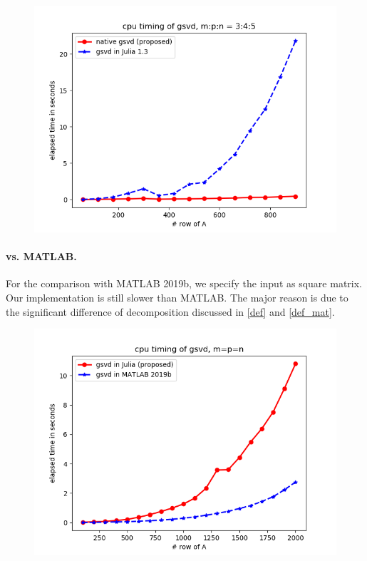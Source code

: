         \begin{figure}[H]
            \centering
            \begin{minipage}{.65\textwidth}
              \centering
              \includegraphics[width=\linewidth]{fig/m p n 3 4 5.png}
            \end{minipage}
            \label{cur_new_2}
        \end{figure}
        
        \paragraph{vs. MATLAB.}
        For the comparison with MATLAB 2019b, we specify the input as square matrix. Our implementation is still slower than MATLAB. The major reason is due to the significant difference of decomposition discussed in \ref{def} and \ref{def_mat}. 
        
        \begin{figure}[H]
            \centering
            \includegraphics[width=0.65\linewidth]{fig/Julia VS MATLAB m=n=p.png}
            \label{julia_matlab}
        \end{figure}
    

